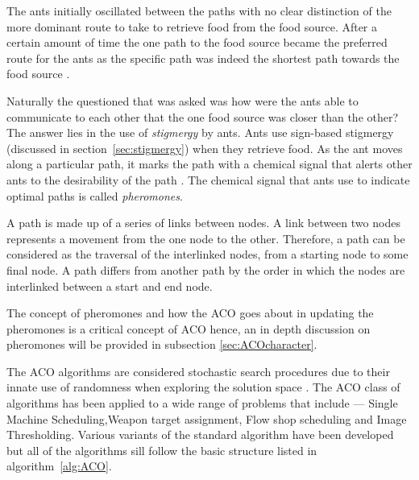 The ants initially oscillated between the paths with no clear distinction of the more dominant route to take to retrieve food from the food source\cite{AntsAndStigmergy,CompuIntelligenceIntro}. After a certain amount of time the one path to the food source became the preferred route for the ants as the specific path was indeed the shortest path towards the food source \cite{AntsAndStigmergy}.

Naturally the questioned that was asked was how were the ants able to communicate to each other that the one food source was closer than the other? The answer lies in the use of \emph{stigmergy} by ants\cite{AntsAndStigmergy,CompuIntelligenceIntro}. Ants use sign-based stigmergy (discussed in section~\ref{sec:stigmergy}) when they retrieve food\cite{AntIntroTrends,AntsAndStigmergy,CompuIntelligenceIntro}. As the ant moves along a particular path, it marks the path with a chemical signal that alerts other ants to the desirability of the path \cite{CompuIntelligenceIntro}. The chemical signal that ants use to indicate optimal paths is called \emph{pheromones}\cite{AntsAndStigmergy,CompuIntelligenceIntro}.

A path is made up of a series of links between nodes\cite{AIModernApproach,DataStructuresJava}. A link between two nodes represents a movement from the one node to the other\cite{AIModernApproach,DataStructuresJava}. Therefore, a path can be considered as the traversal of the interlinked nodes, from a starting node to some final node\cite{AIModernApproach,DataStructuresJava}. A path differs from another path by the order in which the nodes are interlinked between a start and end node\cite{AIModernApproach,DataStructuresJava}.


The concept of pheromones and how the ACO goes about in updating the pheromones is a critical concept of ACO hence, an in depth discussion on pheromones will be provided in subsection \ref{sec:ACOcharacter}.

The ACO algorithms are considered stochastic search procedures due to their innate use of randomness when exploring the solution space \cite{ACOSurvey,ImpACOComplex}. The ACO class of algorithms has been applied to a wide range of problems that include --- Single Machine Scheduling\cite{ACOSingleMachine},Weapon target assignment\cite{WeaponTargetACO}, Flow shop scheduling\cite{ACOFlowShop} and Image Thresholding\cite{ACOImageThreshold}. Various variants of the standard algorithm have been developed but all of the algorithms sill follow the basic structure listed in algorithm~\ref{alg:ACO}\cite{CompuIntelligenceIntro,FundamentalSwarm}.

